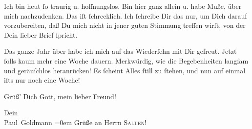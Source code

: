 \pstart
           Ich bin heut ſo traurig u. hoffnungslos. Bin hier ganz
               allein u. habe Muße, über mich nachzudenken. Das iſt ſchrecklich. Ich ſchreibe Dir
               das nur, um Dich darauf vorzubereiten, daß Du mich nicht in jener guten Stimmung
               treffen wirſt, von der Dein lieber Brief ſpricht.\pend
           
\pstart
           {\pb}Das ganze Jahr über habe  ich mich auf das Wiederſehn mit Dir gefreut. Jetzt ſolls kaum mehr eine Woche
               dauern. Merkwürdig, wie die Begebenheiten langſam und geräuſchlos heranrücken! Es
               ſcheint Alles ſtill zu ſtehen, und nun auf einmal iſts nur noch eine Woche! {\dotsfive}\pend
           
\pstart
           Grüß’ Dich Gott, mein lieber Freund!\pend
           
\pstart
           Dein {\\[\baselineskip]}\spacefill\mbox{Paul Goldmann}\pend
           \leftskip=0em{}
\pstart
           \noindent{}Grüße an Herrn \textsc{Salten}!\pend
           \endnumbering{}  
      